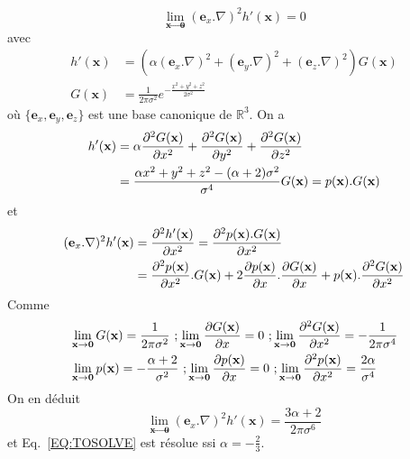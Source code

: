 \begin{equation}
    \lim_{\textbf{x}\to \textbf{0}} (\textbf{e}_x.\nabla)^2 h'(\textbf{x})=0
    \label{EQ:TOSOLVE}
\end{equation}
avec 
\begin{align}
h'(\textbf{x}) & = (\alpha(\textbf{e}_x.\nabla)^2 + (\textbf{e}_y.\nabla)^2 + (\textbf{e}_z.\nabla)^2)G(\textbf{x}) \nonumber \\
G(\textbf{x})& = \frac{1}{2 \pi \sigma^2}e^{-\frac{x^2 + y^2 + z^2}{2\sigma^2}} \nonumber
\end{align}
où $\{\textbf{e}_x, \textbf{e}_y, \textbf{e}_z\}$ est une base canonique de  $\mathbb  R^3$.
On a
\begin{align}
h'(\textbf{x}) & =   \alpha  \frac{\partial ^{2}G(\textbf{x})}{\partial x^2} + \frac{\partial ^{2}G(\textbf{x})}{\partial y^2} + \frac{\partial ^{2}G(\textbf{x})}{\partial z^2} \nonumber \\ 
& = \frac{\alpha x^2 + y^2 + z^2 - (\alpha+2) \sigma^2}{\sigma^4} G(\textbf{x}) = p(\textbf{x}).G(\textbf{x})
\nonumber
\end{align}
et
\begin{align}
    (\textbf{e}_x.\nabla)^2 h'(\textbf{x}) &= \frac{\partial ^{2}h'(\textbf{x})}{\partial x^2} = \frac{\partial ^{2}p(\textbf{x}).G(\textbf{x})}{\partial x^2} \nonumber\\
    & = \frac{\partial ^{2}p(\textbf{x})}{\partial x^2} .G(\textbf{x}) + 2 \frac{\partial p(\textbf{x})}{\partial x} . \frac{\partial G(\textbf{x})}{\partial x} + p(\textbf{x}). \frac{\partial ^{2}G(\textbf{x})}{\partial x^2} \nonumber
\end{align}
Comme
\begin{align}
    &\lim_{\textbf{x}\to \textbf{0}} G(\textbf{x}) = \frac{1}{2 \pi \sigma^2}~; 
    \lim_{\textbf{x}\to \textbf{0}} \frac{\partial G(\textbf{x})}{\partial x}  = 0~; 
    \lim_{\textbf{x}\to \textbf{0}} \frac{\partial ^{2}G(\textbf{x})}{\partial x^{2}}  = -\frac{1}{2 \pi \sigma^4} \nonumber\\
    &\lim_{\textbf{x}\to \textbf{0}} p(\textbf{x}) = - \frac{\alpha + 2}{\sigma^2}~; 
    \lim_{\textbf{x}\to \textbf{0}} \frac{\partial p(\textbf{x})}{\partial x}  = 0~; 
    \lim_{\textbf{x}\to \textbf{0}} \frac{\partial ^{2}p(\textbf{x})}{\partial x^{2}} = \frac{2 \alpha}{\sigma^4} \nonumber
\end{align}
On en déduit
\begin{equation}
\lim_{\textbf{x}\to \textbf{0}} (\textbf{e}_x.\nabla)^2 h'(\textbf{x}) = 
\frac{3\alpha + 2}{2 \pi \sigma^6} \nonumber
\end{equation}
et Eq.~\eqref{EQ:TOSOLVE} est résolue ssi $\alpha = -\frac{2}{3}$.
